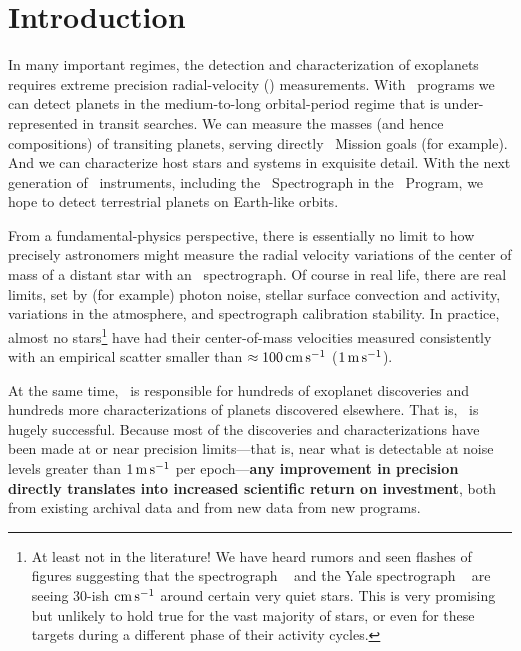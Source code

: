 \documentclass[12pt, letterpaper]{article}
\begin{document}
\sloppy\sloppypar\raggedbottom\frenchspacing

\section*{Introduction}

In many important regimes, the detection and characterization of exoplanets
requires extreme precision radial-velocity (\EPRV)
measurements.
With \EPRV\ programs we can detect planets in the medium-to-long 
orbital-period regime that is under-represented in transit searches.
We can measure the 
masses (and hence compositions) of transiting planets,
serving directly \TESS\ Mission goals (for example).
And we can characterize host stars and systems in exquisite detail.
With the next generation of \EPRV\ 
instruments, including the \NEID\ Spectrograph in the \NNEXPLORE\ Program,
we hope to detect terrestrial planets on Earth-like orbits.

From a fundamental-physics perspective, there is essentially no limit to how
precisely astronomers might measure the radial velocity variations
of the center of mass of a distant star with an \EPRV\ spectrograph.
Of course in real life, there are real limits, set
by (for example) photon noise, stellar surface convection and activity,
variations in the atmosphere, and spectrograph calibration stability.
In practice, almost no stars\footnote{%
  At least not in the literature! We have heard rumors and 
  seen flashes of figures suggesting that the  spectrograph
  \ESPRESSO\ \citep{Pepe2010} and the Yale spectrograph \EXPRES\ 
  \citep{Jurgenson2016} are seeing 
  30-ish ${\mathrm{cm\,s^{-1}}}$ around certain very quiet stars. This is very promising but 
  unlikely to hold true for the vast majority of stars, or even for these targets during a
  different phase of their activity cycles.}
have had their center-of-mass
velocities measured consistently with an empirical scatter
smaller than $\approx 100\,{\mathrm{cm\,s^{-1}}}$ 
($1\,{\mathrm{m\,s^{-1}}}$).

At the same time, \EPRV\ is responsible for hundreds of  exoplanet discoveries and hundreds more \foreign{a
posteriori} characterizations of planets discovered elsewhere.
That is, \EPRV\ is hugely successful.
Because most of the discoveries and characterizations have been made
at or near precision limits---that is, near what is detectable at noise levels
greater than $1\,{\mathrm{m\,s^{-1}}}$ per epoch---\textbf{any improvement in precision directly
translates into increased scientific return on investment},
both from existing archival data and from new data from new programs.
\end{document}
